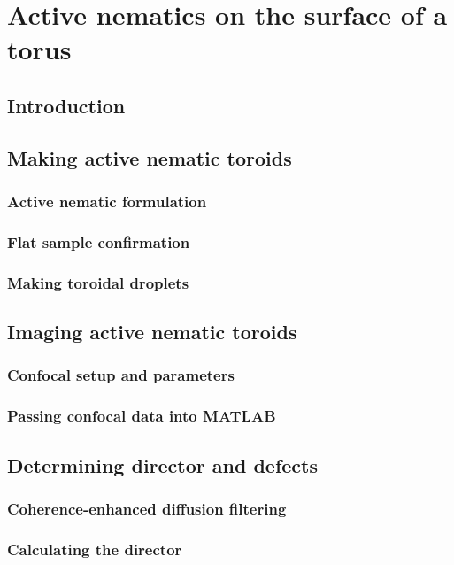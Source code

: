 \chapter{Active nematics on the surface of a torus}

\section{Introduction}

\section{Making active nematic toroids}
\subsection{Active nematic formulation}
\subsection{Flat sample confirmation}
\subsection{Making toroidal droplets}

\section{Imaging active nematic toroids}
\subsection{Confocal setup and parameters}
\subsection{Passing confocal data into MATLAB}

\section{Determining director and defects}
\subsection{Coherence-enhanced diffusion filtering}
\subsection{Calculating the director}
